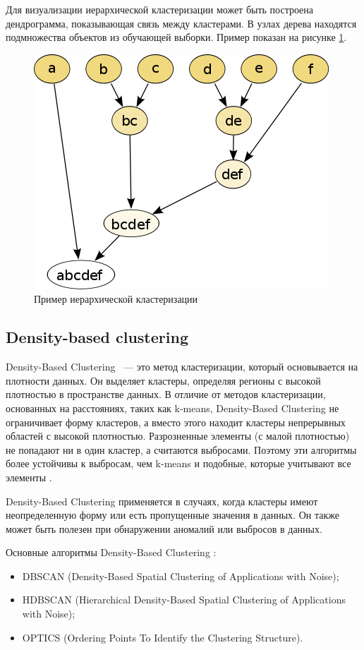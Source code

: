 Для визуализации иерархической кластеризации может быть построена дендрограмма, показывающая связь между кластерами. В узлах дерева находятся подмножества объектов из обучающей выборки. Пример показан на рисунке \ref{img:hierarchy-example}.

\begin{figure}[h]
    \centering
    \includegraphics{images/hierarchy-example.png}
    \caption{Пример иерархической кластеризации}
    \label{img:hierarchy-example}
\end{figure}


\subsection{Density-based clustering}
Density-Based Clustering ~--- это метод кластеризации, который основывается на плотности данных. Он выделяет кластеры, определяя регионы с высокой плотностью в пространстве данных. В отличие от методов кластеризации, основанных на расстояниях, таких как k-means, Density-Based Clustering не ограничивает форму кластеров, а вместо этого находит кластеры непрерывных областей с высокой плотностью. Разрозненные элементы (с малой плотностью) не попадают ни в один кластер, а считаются выбросами. Поэтому эти алгоритмы более устойчивы к выбросам, чем k-means и подобные, которые учитывают все элементы \cite{no-patterns, deep-clustering-survey}.

Density-Based Clustering применяется в случаях, когда кластеры имеют неопределенную форму или есть пропущенные значения в данных. Он также может быть полезен при обнаружении аномалий или выбросов в данных.

Основные алгоритмы Density-Based Clustering \cite{clustering-algs}:
\begin{itemize}
    \item DBSCAN (Density-Based Spatial Clustering of Applications with Noise);
    \item HDBSCAN (Hierarchical Density-Based Spatial Clustering of Applications with Noise);
    \item OPTICS (Ordering Points To Identify the Clustering Structure).
\end{itemize}

